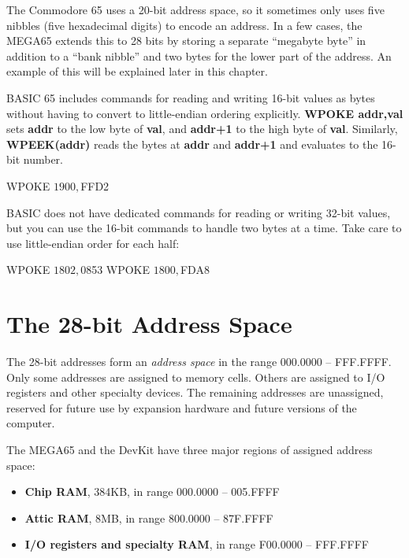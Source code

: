 The Commodore 65 uses a 20-bit address space, so it sometimes only uses five
nibbles (five hexadecimal digits) to encode an address. In a few cases, the
MEGA65 extends this to 28 bits by storing a separate ``megabyte byte'' in
addition to a ``bank nibble'' and two bytes for the lower part of the address.
An example of this will be explained later in this chapter.

BASIC 65 includes commands for reading and writing 16-bit values as bytes
without having to convert to little-endian ordering explicitly. {\bf WPOKE
addr,val} sets {\bf addr} to the low byte of {\bf val}, and {\bf addr+1} to
the high byte of {\bf val}. Similarly, {\bf WPEEK(addr)} reads the bytes at
{\bf addr} and {\bf addr+1} and evaluates to the 16-bit number.

\begin{basiccode}
WPOKE $1900,$FFD2
\end{basiccode}

BASIC does not have dedicated commands for reading or writing 32-bit values,
but you can use the 16-bit commands to handle two bytes at a time. Take care to
use little-endian order for each half:

\begin{basiccode}
WPOKE $1802, $0853
WPOKE $1800, $FDA8
\end{basiccode}


\newpage
\section{The 28-bit Address Space}
\label{sec:programming-with-memory-address-space}

The 28-bit addresses form an {\em address space} in the range 000.0000
-- FFF.FFFF. Only some addresses are assigned to memory cells. Others are assigned to I/O
registers and other specialty devices. The remaining addresses are unassigned, reserved
for future use by expansion hardware and future versions of the computer.

The MEGA65 and the DevKit have three major regions of assigned address space:

\begin{itemize}
\item {\bf Chip RAM}, 384KB, in range 000.0000 -- 005.FFFF
\item {\bf Attic RAM}, 8MB, in range 800.0000 -- 87F.FFFF
\item {\bf I/O registers and specialty RAM}, in range F00.0000 -- FFF.FFFF
\end{itemize}

